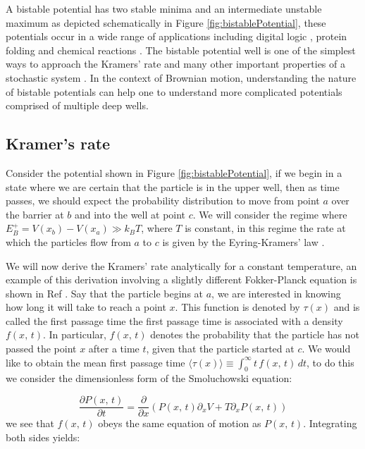 A bistable potential has two stable minima and an intermediate unstable maximum as depicted schematically in Figure \ref{fig:bistablePotential}, these potentials occur in a wide range of applications including digital logic \cite{MyersCelebranoKrishnan2015,Landauer1961}, protein folding \cite{BryngelsonWolynes1989} and chemical reactions \cite{BernePecora1976}. The bistable potential well is one of the simplest ways to approach the Kramers' rate and many other important properties of a stochastic system \cite{MyersCelebranoKrishnan2015,Barcilon1996,SantamariaHolekGadomskiRubi2011}. In the context of Brownian motion, understanding the nature of bistable potentials can help one to understand more complicated potentials comprised of multiple deep wells.

\subsection{Kramer's rate}
Consider the potential shown in Figure \ref{fig:bistablePotential}, if we begin in a state where we are certain that the particle is in the upper well, then as time passes, we should expect the probability distribution to move from point $a$ over the barrier at $b$ and into the well at point $c$. We will consider the regime where $E^+_B = V(x_b) - V(x_a) \gg k_B T$, where $T$ is constant, in this regime the rate at which the particles flow from $a$ to $c$ is given by the Eyring-Kramers' law \cite{Eyring1935, Kramers1940}.

We will now derive the Kramers' rate analytically for a constant temperature, an example of this derivation involving a slightly different Fokker-Planck equation is shown in Ref \cite{Gardiner2009}. Say that the particle begins at $a$, we are interested in knowing how long it will take to reach a point $x$. This function is denoted by $\tau(x)$ and is called the first passage time \cite{Gardiner2009} the first passage time is associated with a density $f(x, \, t)$. In particular, $f(x, \, t)$ denotes the probability that the particle has not passed the point $x$ after a time $t$, given that the particle started at $c$. We would like to obtain the mean first passage time $\langle \tau(x) \rangle \equiv \int_0^{\infty} t \, f(x, \, t) \, dt$, to do this we consider the dimensionless form of the Smoluchowski equation: 

\begin{equation}
\frac{\partial P(x, \, t)}{\partial t} = \frac{\partial}{\partial x} \left(P(x, \, t) \partial_x V + T \partial_x P(x, \, t) \right)
\end{equation}
we see that $f(x, \, t)$ obeys the same equation of motion as $P(x, \, t)$. Integrating both sides yields:

